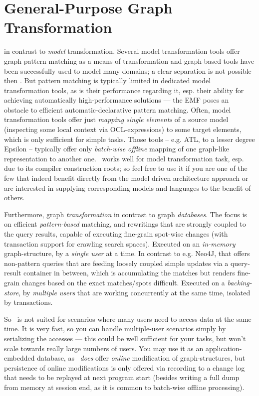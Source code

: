 \section{General-Purpose Graph Transformation}
in contrast to \emph{model} transformation.
Several model transformation tools offer graph pattern matching as a means of transformation and graph-based tools have been successfully used to model many domains; a clear separation is not possible then \cite{Jakumeit2013}.
But pattern matching is typically limited in dedicated model transformation tools, as is their performance regarding it, esp. their ability for achieving automatically high-performance solutions --- the EMF poses an obstacle to efficient automatic-declarative pattern matching.
Often, model transformation tools offer just \emph{mapping single elements} of a source model (inspecting some local context via OCL-expressions) to some target elements, which is only sufficient for simple tasks.
Those tools -- e.g. ATL\cite{atl}, to a lesser degree Epsilon\cite{epsilon} -- typically offer only \emph{batch-wise offline} mapping of one graph-like representation to another one.
\GrG\ works well for model transformation task, esp. due to its compiler construction roots; so feel free to use it if you are one of the few that indeed benefit directly from the model driven architecture approach or are interested in supplying corresponding models and languages to the benefit of others. 

Furthermore, graph \emph{transformation} in contrast to graph \emph{databases}.
The focus is on efficient \emph{pattern-based} matching, and rewritings that are strongly coupled to the query results, capable of executing fine-grain spot-wise changes (with transaction support for crawling search spaces). 
Executed on an \emph{in-memory} graph-structure, by a \emph{single user} at a time.
In contrast to e.g. Neo4J\cite{neo}, that offers non-pattern queries that are feeding loosely coupled simple updates via a query-result container in between, which is accumulating the matches but renders fine-grain changes based on the exact matches/spots difficult.
Executed on a \emph{backing-store}, by \emph{multiple users} that are working concurrently at the same time, isolated by transactions.

So \GrG\ is not suited for scenarios where many users need to access data at the same time. 
It is very fast, so you can handle multiple-user scenarios simply by serializing the accesses --- this could be well sufficient for your tasks, but won't scale towards really large numbers of users.
You may use it as an application-embedded database, as
\GrG\ \emph{does} offer \emph{online} modification of graph-structures,
but persistence of online modifications is only offered via recording to a change log that needs to be replayed at next program start
(besides writing a full dump from memory at session end, as it is common to batch-wise offline processing).

